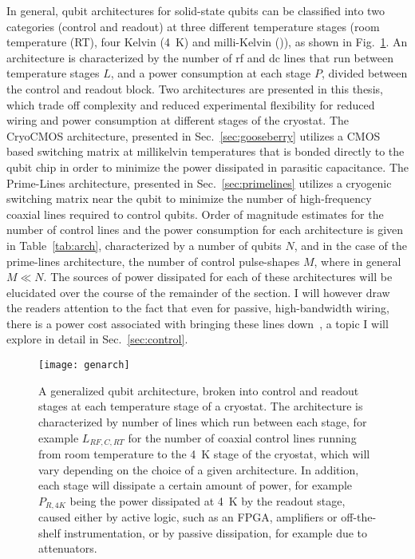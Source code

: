 In general, qubit architectures for solid-state qubits can be classified into two categories (control and readout) at three different temperature stages
(room temperature (RT), four Kelvin (\SI{4}{\kelvin}) and milli-Kelvin (\si{\mk})), as shown in Fig.~\ref{fig:genarch}. An
architecture is characterized by the number of rf and dc lines that run between temperature stages $L$, and a power consumption at each stage $P$, divided between the control
and readout block. Two architectures are presented in this thesis, which trade off complexity and reduced experimental flexibility for reduced wiring and power consumption
at different stages of the cryostat. The CryoCMOS architecture, presented in Sec.~\ref{sec:gooseberry} utilizes a CMOS based switching matrix at millikelvin temperatures that is
bonded directly to the qubit chip in order to minimize the power dissipated in parasitic capacitance. The Prime-Lines architecture, presented in Sec.~\ref{sec:primelines}
utilizes a cryogenic switching matrix near the qubit to minimize the number of high-frequency coaxial lines required to control qubits. Order of magnitude estimates
for the number of control lines and the power consumption for each architecture is given in Table~\ref{tab:arch}, characterized by a number of qubits $N$,
and in the case of the prime-lines architecture, the number of control pulse-shapes $M$, where in general $M \ll N$. The sources of power dissipated for each of these architectures
will be elucidated over the course of the remainder of the section. I will however draw the readers attention to the fact that even for passive, high-bandwidth wiring, there is a
power cost associated with bringing these lines down~\cite{Krinner2019}, a topic I will explore in detail in Sec.~\ref{sec:control}.

\begin{figure}
  \texttt{[image: genarch]}
  \caption[Generalized quantum computing architecture]
  {\label{fig:genarch}A generalized qubit architecture, broken into control and readout stages at each temperature stage of a cryostat. The architecture is characterized by number of lines which run between each stage, for example $L_{RF,C,RT}$ for the number of coaxial control lines running from room temperature to the \SI{4}{\kelvin} stage of the cryostat, which will vary depending on the choice of a given architecture. In addition, each stage will dissipate a certain amount of power, for example $P_{R,4K}$ being the power dissipated at \SI{4}{\kelvin} by the readout stage, caused either by active logic, such as an FPGA, amplifiers or off-the-shelf instrumentation, or by passive dissipation, for example due to attenuators.}
\end{figure}

